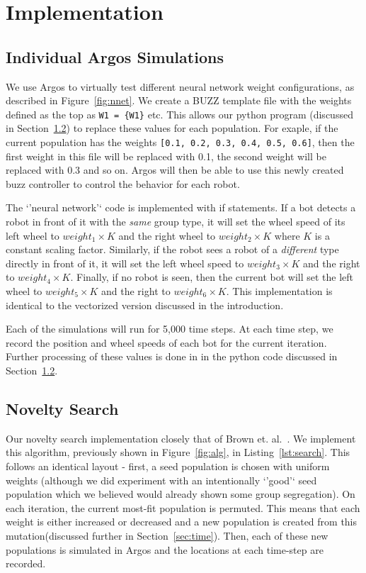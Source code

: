 \section{Implementation}
\label{sec:imp}

\subsection{Individual Argos Simulations}

We use Argos to virtually test different neural network weight configurations, as described in Figure~\ref{fig:nnet}. 
We create a BUZZ template file with the weights defined as the top as \texttt{W1 = \{W1\}} etc.
This allows our python program (discussed in Section~\ref{sec:nov}) to replace these values for each population.
For exaple, if the current population has the weights \texttt{[0.1, 0.2, 0.3, 0.4, 0.5, 0.6]}, then the first weight in this file will be replaced with 0.1, the second weight will be replaced with 0.3 and so on. 
Argos will then be able to use this newly created buzz controller to control the behavior for each robot. 

The `'neural network'` code is implemented with if statements. 
If a bot detects a robot in front of it with the \emph{same} group type, it will set the wheel speed of its left wheel to $weight_1 \times K$ and the right wheel to $weight_2 \times K$ where $K$ is a constant scaling factor. 
Similarly, if the robot sees a robot of a \emph{different} type directly in front of it, it will set the left wheel speed to $weight_3 \times K$ and the right to $weight_4 \times K$. 
Finally, if no robot is seen, then the current bot will set the left wheel to $weight_5 \times K$ and the right to $weight_6 \times K$. 
This implementation is identical to the vectorized version discussed in the introduction. 

Each of the simulations will run for 5,000 time steps. 
At each time step, we record the position and wheel speeds of each bot for the current iteration. 
Further processing of these values is done in in the python code discussed in Section~\ref{sec:nov}.

\subsection{Novelty Search}
\label{sec:nov}

Our novelty search implementation closely that of Brown et. al.~\cite{c1}.
We implement this algorithm, previously shown in Figure~\ref{fig:alg}, in Listing~\ref{lst:search}.
This follows an identical layout - first, a seed population is chosen with uniform weights (although we did experiment with an intentionally `'good'` seed population which we believed would already shown some group segregation). 
On each iteration, the current most-fit population is permuted.
This means that each weight is either increased or decreased and a new population is created from this mutation(discussed further in Section~\ref{sec:time}).
Then, each of these new populations is simulated in Argos and the locations at each time-step are recorded.

